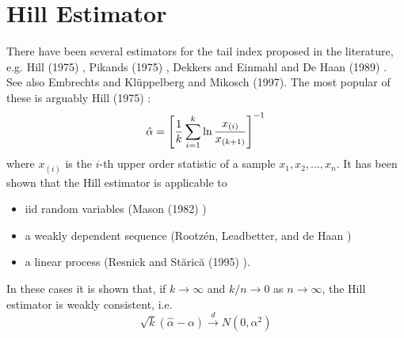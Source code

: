 \documentclass{article}
\begin{document}
\section{Hill Estimator}
There have been several estimators for the tail index proposed in the
literature, e.g. Hill (1975) \cite{hill1975simple}, Pikands (1975)
\cite{pickands1975statistical}, Dekkers and Einmahl and De Haan (1989)
\cite{dekkers1989moment}. See also Embrechts and Kl\"uppelberg and
Mikosch (1997)\cite{Embrechts1997}. The most popular of these is
arguably Hill (1975) \cite{hill1975simple}:
\[
\hat \alpha = \left[
  {1 \over k} \sum_{i=1}^k \ln {x_{(i)} \over x_{(k+1)}}
  \right]^{-1}
\]
where $x_{(i)}$ is the $i$-th upper order statistic of a sample
$x_1, x_2, ..., x_n$. It has been shown that the Hill estimator is
applicable to 
\begin{itemize}
\item iid random variables (Mason (1982) \cite{mason1982laws})
\item a weakly dependent sequence (Rootz{\'e}n, Leadbetter,
  and de Haan \cite{rootzen1992tail})
\item a linear process (Resnick and St{\u{a}}ric{\u{a}} (1995)
  \cite{resnick1995consistency}).
\end{itemize}
In these cases it is shown that, if $k \to \infty$ and $k/n \to 0$
as $n \to \infty$, the Hill estimator is weakly consistent, i.e.
\[
\sqrt k (\hat \alpha - \alpha) \overset{d}{\to} N(0, \alpha^2)
\]

\end{document}
